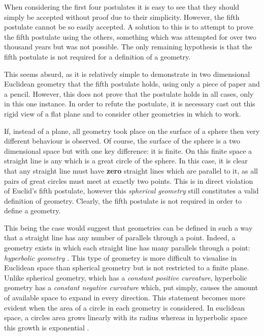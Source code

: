 When considering the first four postulates it is easy to see that they should simply be accepted without proof due to their simplicity. However, the fifth postulate cannot be so easily accepted. A solution to this is to attempt to prove the fifth postulate using the others, something which was attempted for over two thousand years \cite{ratcliffe_foundations_2006} but was not possible. The only remaining hypothesis is that the fifth postulate is not required for a definition of a geometry.

This seems absurd, as it is relatively simple to demonstrate in two dimensional Euclidean geometry that the fifth postulate holds, using only a piece of paper and a pencil. However, this does not prove that the postulate holds in all cases, only in this one instance. In order to refute the postulate, it is necessary cast out this rigid view of a flat plane and to consider other geometries in which to work. 

If, instead of a plane, all geometry took place on the surface of a sphere then very different behaviour is observed. Of course, the surface of the sphere is a two dimensional space but with one key difference: it is finite. On this finite space a straight line is any which is a great circle of the sphere. In this case, it is clear that any straight line must have \textbf{zero} straight lines which are parallel to it, as all pairs of great circles must meet at exactly two points. This is in direct violation of Euclid's fifth postulate, however this \textit{spherical geometry} still constitutes a valid definition of geometry. Clearly, the fifth postulate is not required in order to define a geometry.

This being the case would suggest that geometries can be defined in such a way that a straight line has any number of parallels through a point. Indeed, a geometry exists in which each straight line has many parallels through a point: \textit{hyperbolic geometry} \cite{munzner_visualizing_1995}. This type of geometry is more difficult to visualise in Euclidean space than spherical geometry but is not restricted to a finite plane. Unlike spherical geometry, which has a \textit{constant positive curvature}, hyperbolic geometry has a \textit{constant negative curvature} which, put simply, causes the amount of available space to expand in every direction. This statement becomes more evident when the area of a circle in each geometry is considered. In euclidean space, a circles area grows linearly with its radius whereas in hyperbolic space this growth is exponential \cite{munzner_visualizing_1995}.

